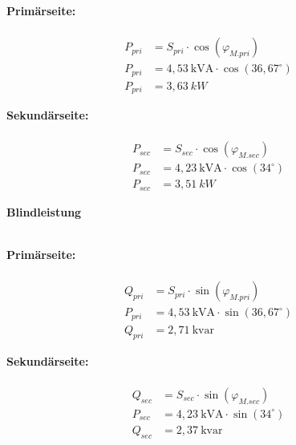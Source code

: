\begin{enumerate}[label=\alph*)]
\begin{tcolorbox}[colback=gray!30,
			      colframe=black,
			      width=0.9\textwidth,
		      ]
{			      \begin{minipage}{0.5\textwidth}
				      \textbf{Primärseite:}\\ \ \\
				      \begin{align*}
					      P_{pri} & = S_{pri} \cdot \cos(\varphi_{M.pri})      \\
					      P_{pri} & = 4,53\ \text{kVA} \cdot \cos(36,67^\circ) \\
					      P_{pri} & = 3,63\ kW
				      \end{align*}
			      \end{minipage}\hfill
			      \begin{minipage}{0.5\textwidth}
				      \textbf{Sekundärseite:}\\ \ \\
				      \begin{align*}
					      P_{sec} & = S_{sec} \cdot \cos(\varphi_{M.sec})   \\
					      P_{sec} & = 4,23\ \text{kVA} \cdot \cos(34^\circ) \\
					      P_{sec} & = 3,51\ kW
				      \end{align*}
			      \end{minipage}
		      }
	      \end{tcolorbox}

	      \textbf{Blindleistung}\\ \ \\
	      \begin{tcolorbox}[colback=gray!30,
			      colframe=black,
			      width=0.9\textwidth,
		      ]
		      \parbox{\textwidth}{

			      \begin{minipage}{0.5\textwidth}
				      \textbf{Primärseite:}\\ \ \\
				      \begin{align*}
					      Q_{pri} & = S_{pri} \cdot \sin(\varphi_{M.pri})      \\
					      P_{pri} & = 4,53\ \text{kVA} \cdot \sin(36,67^\circ) \\
					      Q_{pri} & = 2,71\ \text{kvar}
				      \end{align*}
			      \end{minipage}\hfill
			      \begin{minipage}{0.5\textwidth}
				      \textbf{Sekundärseite:}\\ \ \\
				      \begin{align*}
					      Q_{sec} & = S_{sec} \cdot \sin(\varphi_{M.sec})   \\
					      P_{sec} & = 4,23\ \text{kVA} \cdot \sin(34^\circ) \\
					      Q_{sec} & = 2,37\ \text{kvar}
				      \end{align*}
			      \end{minipage}
		      }
	      \end{tcolorbox}


\end{enumerate}
